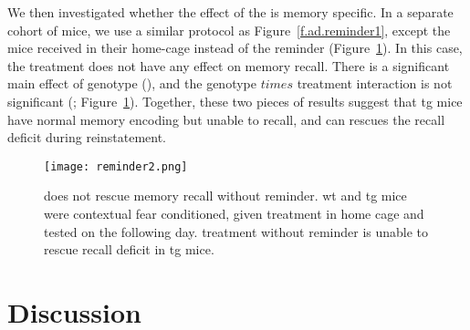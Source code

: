 We then investigated whether the effect of the \tglu is memory specific. In a separate cohort of mice, we use a similar protocol as Figure~\ref{f.ad.reminder1}, except the mice received \tglu in their home-cage instead of the reminder (Figure~\ref{f.ad.reminder2}). In this case, the \tglu treatment does not have any effect on memory recall. There is a significant main effect of genotype (), and the genotype $times$ treatment interaction is not significant (; Figure~\ref{f.ad.reminder2}). Together, these two pieces of results suggest that \gls{tg} mice have normal memory encoding but unable to recall, and \tglu can rescues the recall deficit during reinstatement. 


\begin{figure}[h]
    \texttt{[image: reminder2.png]}
    \caption{\tglu does not rescue memory recall without reminder. \gls{wt} and \gls{tg} mice were contextual fear conditioned, given treatment in home cage and tested on the following day. \tglu treatment without reminder is unable to rescue recall deficit in \gls{tg} mice. \label{f.ad.reminder2}}
\end{figure}

\section{Discussion}

